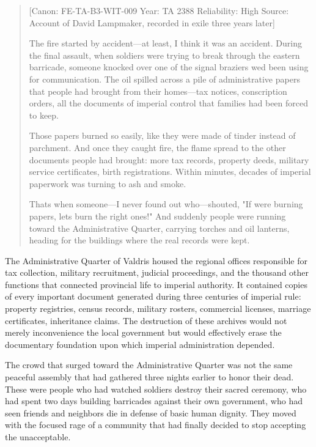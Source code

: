 \begin{quote}
{[}Canon: FE-TA-B3-WIT-009 \textbar{} Year: TA 2388 \textbar{}
Reliability: High \textbar{} Source: Account of David Lampmaker,
recorded in exile three years later{]}

The fire started by accident---at least, I think it was an accident.
During the final assault, when soldiers were trying to break through the
eastern barricade, someone knocked over one of the signal braziers
we\textquotesingle d been using for communication. The oil spilled
across a pile of administrative papers that people had brought from
their homes---tax notices, conscription orders, all the documents of
imperial control that families had been forced to keep.

Those papers burned so easily, like they were made of tinder instead of
parchment. And once they caught fire, the flame spread to the other
documents people had brought: more tax records, property deeds, military
service certificates, birth registrations. Within minutes, decades of
imperial paperwork was turning to ash and smoke.

That\textquotesingle s when someone---I never found out who---shouted,
"If we\textquotesingle re burning papers, let\textquotesingle s burn the
right ones!" And suddenly people were running toward the Administrative
Quarter, carrying torches and oil lanterns, heading for the buildings
where the real records were kept.
\end{quote}

The Administrative Quarter of Valdris housed the regional offices
responsible for tax collection, military recruitment, judicial
proceedings, and the thousand other functions that connected provincial
life to imperial authority. It contained copies of every important
document generated during three centuries of imperial rule: property
registries, census records, military rosters, commercial licenses,
marriage certificates, inheritance claims. The destruction of these
archives would not merely inconvenience the local government but would
effectively erase the documentary foundation upon which imperial
administration depended.

The crowd that surged toward the Administrative Quarter was not the same
peaceful assembly that had gathered three nights earlier to honor their
dead. These were people who had watched soldiers destroy their sacred
ceremony, who had spent two days building barricades against their own
government, who had seen friends and neighbors die in defense of basic
human dignity. They moved with the focused rage of a community that had
finally decided to stop accepting the unacceptable.

